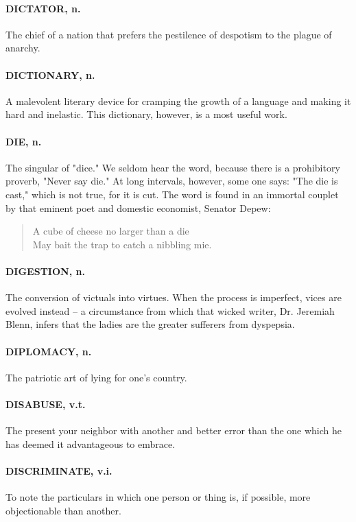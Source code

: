 \documentclass[11pt]{article}
\begin{document}
\paragraph{DICTATOR, n.}  The chief of a nation that prefers the pestilence of
despotism to the plague of anarchy.

\paragraph{DICTIONARY, n.}  A malevolent literary device for cramping the growth
of a language and making it hard and inelastic.  This dictionary,
however, is a most useful work.

\paragraph{DIE, n.}  The singular of "dice."  We seldom hear the word, because
there is a prohibitory proverb, "Never say die."  At long intervals,
however, some one says:  "The die is cast," which is not true, for it
is cut.  The word is found in an immortal couplet by that eminent poet
and domestic economist, Senator Depew:

\begin{quote}   A cube of cheese no larger than a die \\
  May bait the trap to catch a nibbling mie.  \end{quote}

\paragraph{DIGESTION, n.}  The conversion of victuals into virtues.  When the
process is imperfect, vices are evolved instead -- a circumstance from
which that wicked writer, Dr. Jeremiah Blenn, infers that the ladies
are the greater sufferers from dyspepsia.

\paragraph{DIPLOMACY, n.}  The patriotic art of lying for one's country.

\paragraph{DISABUSE, v.t.}  The present your neighbor with another and better
error than the one which he has deemed it advantageous to embrace.

\paragraph{DISCRIMINATE, v.i.}  To note the particulars in which one person or
thing is, if possible, more objectionable than another.
\end{document}
